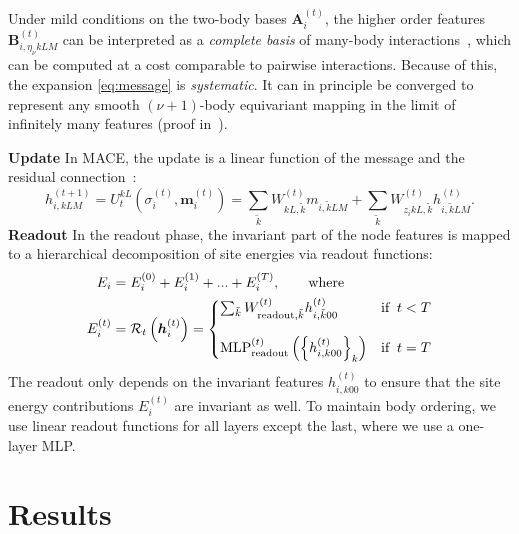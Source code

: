 \documentclass{article}
\def\kk{k}
\newcommand*\compactparagraph[1]{\textbf{#1} \quad}
\begin{document}
Under mild conditions on the two-body bases $\bm{A}_{i}^{(t)}$,
the higher order features ${\bm B}^{(t)}_{i,\eta_{\nu} \kk LM}$ can be interpreted as a \emph{complete basis} of many-body interactions~\cite{dusson2022atomic}, which can be computed at a cost comparable to pairwise interactions.
Because of this, the expansion \eqref{eq:message} is \emph{systematic}.
It can in principle be converged to represent any smooth $(\nu + 1)$-body equivariant mapping in the limit of infinitely many features (proof in~\cite{dusson2022atomic}).

\compactparagraph{Update}
In MACE, the update is a linear function of the message and the residual connection~\cite{resnet2015}:
\begin{equation}
  h^{(t+1)}_{i,\kk LM} = U_{t}^{\kk L}( \sigma_i^{(t)}, {\bm m}_{i}^{(t)}) =
  \sum_{\tilde{\kk}} W_{\kk L,\tilde{\kk}}^{(t)} m_{i,\tilde{\kk}LM}
  + \sum_{\tilde{\kk}} W_{z_{i}\kk L,\tilde{\kk}}^{(t)}
  h^{(t)}_{i,\tilde{\kk}LM}.
\end{equation}
%
\compactparagraph{Readout}
In the readout phase, the invariant part of the node features is mapped to a hierarchical decomposition of site energies via readout functions:
\begin{equation}
  \label{eq:readout_mace}
  \begin{split}
    E_{i} &= E^{(0)}_{i} + E^{(1)}_{i} + ... + E^{(T)}_{i}, \qquad
    \text{where} \\
    E_i^{(t)} &=
    \mathcal{R}_t \left( \boldsymbol{h}_i^{(t)} \right) =
    \begin{cases}
      \sum_{\tilde{\kk}}W^{(t)}_{\text{readout},\tilde{\kk}}h^{(t)}_{i,\tilde{\kk}00}      & \text{if} \;\; t < T \\[13pt]
      {\rm MLP}^{(t)}_\text{readout} \left( \left\{ h^{(t)}_{i,\kk00} \right\}_\kk \right) & \text{if} \;\; t = T
    \end{cases}
  \end{split}
\end{equation}
The readout only depends on the invariant features $h_{i,k00}^{(t)}$ to ensure that the site energy contributions $E_i^{(t)}$ are invariant as well.
To maintain body ordering, we use linear readout functions for all layers except the last, where we use a one-layer MLP.

\section{Results}
\end{document}
